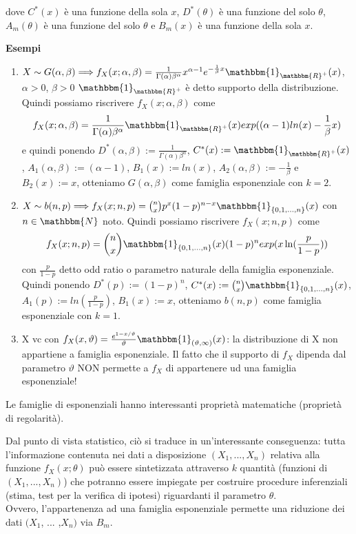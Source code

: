 dove $C^*(x)$ è una funzione della sola $x$, $D^*(\theta)$ è una funzione del solo $\theta$, $A_m(\theta)$ è una funzione del solo $\theta$ e $B_m(x)$ è una funzione della sola $x$.

\noindent \textbf{Esempi}
\begin{enumerate}
\item 
$X \sim G(\alpha, \beta) \Longrightarrow f_X(x; \alpha, \beta) = \frac{1}{\Gamma(\alpha) \beta^\alpha} x^{\alpha -1} e^{- \frac{1}{\beta} x} \mathbbm{1}_{\mathbbm{R}^+}(x)$, $\alpha >0$, $\beta >0$
$\mathbbm{1}_{\mathbbm{R}^+}$ è detto supporto della distribuzione.
Quindi possiamo riscrivere $f_X(x; \alpha, \beta)$ come
$$f_X(x; \alpha, \beta) = \frac{1}{\Gamma(\alpha) \beta^\alpha} \mathbbm{1}_{\mathbbm{R}^+}(x) exp((\alpha -1) ln(x) - \frac{1}{\beta} x)$$
e quindi ponendo $D^*(\alpha, \beta) := \frac{1}{\Gamma(\alpha) \beta^\alpha}$, $C^*(x) := \mathbbm{1}_{\mathbbm{R}^+}(x)$, $A_1(\alpha, \beta) := (\alpha -1)$, $B_1(x) := ln(x)$, $A_2(\alpha, \beta) := - \frac{1}{\beta}$ e $B_2(x) := x$, otteniamo $G(\alpha, \beta)$ come famiglia esponenziale con $k=2$.

\item $X \sim b(n,p) \Longrightarrow f_X(x; n,p) = \binom{n}{x} p^x (1-p)^{n-x} \mathbbm{1}_{\lbrace 0,1,...,n \rbrace}(x)$ con $n \in \mathbbm{N}$ noto.
Quindi possiamo riscrivere $f_X(x; n,p)$ come
$$f_X(x; n,p) = \binom{n}{x} \mathbbm{1}_{\lbrace 0,1,...,n \rbrace}(x) (1-p)^n exp(x \ln(\frac{p}{1-p}))$$ con $\frac{p}{1-p}$ detto odd ratio o parametro naturale della famiglia esponenziale.\\
Quindi ponendo $D^*(p) := (1-p)^n$, $C^*(x) := \binom{n}{x} \mathbbm{1}_{\lbrace 0,1,...,n \rbrace}(x)$, $A_1(p) := ln(\frac{p}{1-p})$, $B_1(x) := x$, otteniamo $b(n,p)$ come famiglia esponenziale con $k=1$.

\item X vc con $f_X(x,\vartheta)=\frac{e^{1-x/\vartheta}}{\vartheta}\mathbbm{1}_{(\vartheta,\infty)}(x)$: la distribuzione di X non appartiene a famiglia esponenziale.
Il fatto che il supporto di $f_X$ dipenda dal parametro $\vartheta$ NON permette a $f_X$ di appartenere ud una famiglia esponenziale!
\end{enumerate}

\begin{oss}
Le famiglie di esponenziali hanno interessanti proprietà matematiche (proprietà di regolarità).

Dal punto di vista statistico, ciò si traduce in un'interessante conseguenza: tutta l'informazione contenuta nei dati a disposizione $(X_1,...,X_n)$ relativa alla funzione $f_X (x; \theta)$ può essere sintetizzata attraverso $k$ quantità (funzioni di $(X_1,...,X_n)$) che potranno essere impiegate per costruire procedure inferenziali (stima, test per la verifica di ipotesi) riguardanti il parametro $\theta$.\\
Ovvero, l'appartenenza ad una famiglia esponenziale permette una riduzione dei dati $(X_1$, ... ,$X_n)$ via $B_m$.\end{oss}